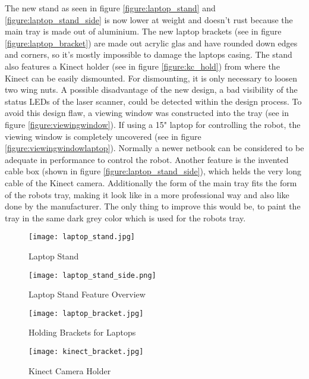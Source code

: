 The new stand as seen in figure \vref{figure:laptop_stand} and \vref{figure:laptop_stand_side} is now lower at
weight and doesn't rust because the main tray is made out of aluminium. The new laptop brackets 
(see in figure \vref{figure:laptop_bracket}) are made out acrylic glas and have rounded down edges and corners, 
so it's mostly impossible to damage the laptops casing. The stand also features a Kinect holder 
(see in figure \vref{figure:kc_hold}) from where the Kinect can be easily dismounted. For dismounting, 
it is only necessary to loosen two wing nuts. A possible disadvantage of the new design, a bad visibility of
the status LEDs of the laser scanner, could be detected within the design process. 
To avoid this design flaw, a viewing window was constructed into the tray (see in figure \vref{figure:viewingwindow}). 
If using a 15" laptop for controlling the robot, the viewing window is completely uncovered 
(see in figure \vref{figure:viewingwindowlaptop}). Normally a newer netbook can be considered to be 
adequate in performance to control the robot. Another feature is the invented cable box 
(shown in figure \vref{figure:laptop_stand_side}), which helds the very long cable of the Kinect camera. 
Additionally the form of the main tray fits the form of the robots tray, making it look like in a more professional 
way and also like done by the manufacturer. The only thing to improve this would be, to paint the tray in the 
same dark grey color which is used for the robots tray.

\begin{figure}[htp]
\begin{center}
  \texttt{[image: laptop\_stand.jpg]}
  \caption{Laptop Stand}
  \label{figure:laptop_stand}
\end{center}
\end{figure}
\begin{figure}[htp]
\begin{center}
  \texttt{[image: laptop\_stand\_side.png]}
  \caption{Laptop Stand Feature Overview}
  \label{figure:laptop_stand_side}
\end{center}
\end{figure}


\begin{figure}[htp]
\begin{center}
  \texttt{[image: laptop\_bracket.jpg]}
  \caption{Holding Brackets for Laptops}
  \label{figure:laptop_bracket}
\end{center}
\end{figure}
\begin{figure}[htp]
\begin{center}
  \texttt{[image: kinect\_bracket.jpg]}
  \caption{Kinect Camera Holder}
  \label{figure:kc_hold}
\end{center}
\end{figure}

